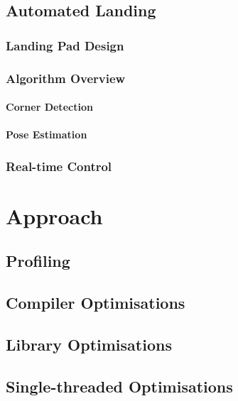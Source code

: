 \documentclass{acm_proc_article-sp}
\begin{document}
\subsection{Automated Landing}

\subsubsection{Landing Pad Design}
\subsubsection{Algorithm Overview}
\paragraph{Corner Detection}
\paragraph{Pose Estimation}

\subsubsection{Real-time Control}

\section{Approach\label{secapproach}}

\subsection{Profiling}



\subsection{Compiler Optimisations}

\subsection{Library Optimisations}

\subsection{Single-threaded Optimisations}
\end{document}
